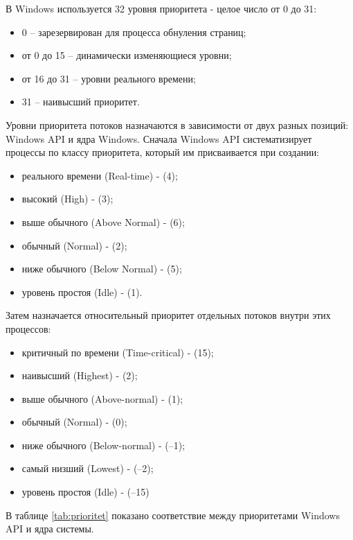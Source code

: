 В Windows используется 32 уровня приоритета - целое число от 0 до 31:
\begin{itemize}[label*=---]
	\item 0 -- зарезервирован для процесса обнуления страниц;
	\item от 0 до 15 -- динамически изменяющиеся уровни;
	\item от 16 до 31 -- уровни реального времени;
	\item 31 -- наивысший приоритет.
\end{itemize}

Уровни приоритета потоков назначаются в зависимости от двух разных позиций: Windows API и ядра Windows.
Сначала Windows API систематизирует процессы по классу приоритета, который им присваивается при создании:
\begin{itemize}[label*=---]
	\item реального времени (Real-time) - (4);
	\item высокий (High) - (3);
	\item выше обычного (Above Normal) - (6);
	\item обычный (Normal) - (2);
	\item ниже обычного (Below Normal) - (5);
	\item уровень простоя (Idle) - (1).
\end{itemize}

Затем назначается относительный приоритет отдельных потоков внутри этих процессов:
\begin{itemize}[label*=---]
	\item критичный по времени (Time-critical) - (15);
	\item наивысший (Highest) - (2);
	\item выше обычного (Above-normal) - (1);
	\item обычный (Normal) - (0);
	\item ниже обычного (Below-normal) - (–1);
	\item самый низший (Lowest) - (–2);
	\item уровень простоя (Idle) - (–15)
\end{itemize}

В таблице \ref{tab:prioritet} показано соответствие между приоритетами Windows API и ядра системы.

